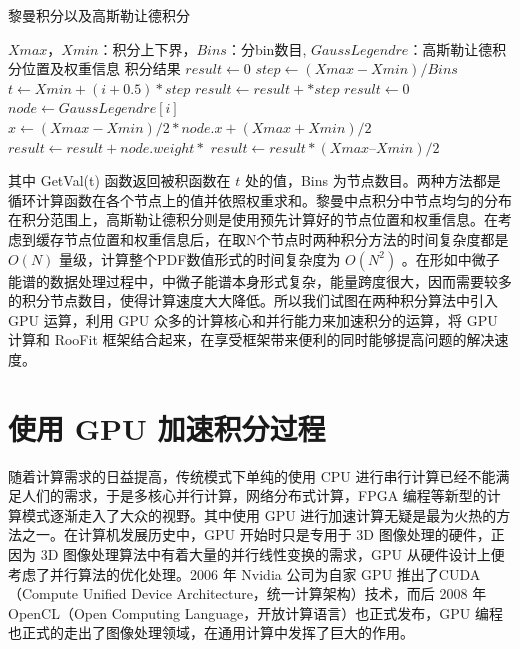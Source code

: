 \begin{algorithm}  
    \caption{黎曼积分以及高斯勒让德积分}  
    \begin{algorithmic}[1] 
        \Require 
            $Xmax$，$Xmin$：积分上下界，$Bins$：分bin数目, $GaussLegendre$：高斯勒让德积分位置及权重信息
        \Ensure 
            积分结果
            \State $result \gets 0$  
            \State $step \gets (Xmax - Xmin) / Bins$
                \State $t \gets Xmin + (i + 0.5) * step$
                \State $result \gets result + $$ * step$
            \EndFor
            \State {}
        \EndFunction
            \State $result \gets 0$  
                \State $node \gets GaussLegendre[i]$
                \State $x \gets (Xmax-Xmin)/ 2 * node.x + (Xmax + Xmin) / 2$
                \State $result \gets result + node.weight * 
                $
            \EndFor
            \State $result \gets result * (Xmax – Xmin) / 2$
            \State {}
        \EndFunction
    \end{algorithmic}  
    \label{code:1}
\end{algorithm}  

其中 GetVal(t) 函数返回被积函数在 $t$ 处的值，Bins 为节点数目。两种方法都是循环计算函数在各个节点上的值并依照权重求和。黎曼中点积分中节点均匀的分布在积分范围上，高斯勒让德积分则是使用预先计算好的节点位置和权重信息。在考虑到缓存节点位置和权重信息后，在取N个节点时两种积分方法的时间复杂度都是 $O(N)$ 量级，计算整个PDF数值形式的时间复杂度为 $O(N^2)$ 。在形如中微子能谱的数据处理过程中，中微子能谱本身形式复杂，能量跨度很大，因而需要较多的积分节点数目，使得计算速度大大降低。所以我们试图在两种积分算法中引入 GPU 运算，利用 GPU 众多的计算核心和并行能力来加速积分的运算，将 GPU 计算和 RooFit 框架结合起来，在享受框架带来便利的同时能够提高问题的解决速度。

\section{使用 GPU 加速积分过程}
随着计算需求的日益提高，传统模式下单纯的使用 CPU 进行串行计算已经不能满足人们的需求，于是多核心并行计算，网络分布式计算，FPGA 编程等新型的计算模式逐渐走入了大众的视野。其中使用 GPU 进行加速计算无疑是最为火热的方法之一。在计算机发展历史中，GPU 开始时只是专用于 3D 图像处理的硬件，正因为 3D 图像处理算法中有着大量的并行线性变换的需求，GPU 从硬件设计上便考虑了并行算法的优化处理。2006 年 Nvidia 公司为自家 GPU 推出了CUDA（Compute Unified Device Architecture，统一计算架构）技术\supercite{CUDA}，而后 2008 年 OpenCL（Open Computing Language，开放计算语言）也正式发布\supercite{opencl}，GPU 编程也正式的走出了图像处理领域，在通用计算中发挥了巨大的作用。

